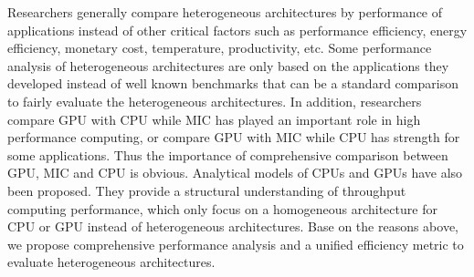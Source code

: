 Researchers generally compare heterogeneous architectures by performance of applications instead of other critical factors such as performance efficiency, energy efficiency, monetary cost, temperature, productivity, etc. Some performance analysis of heterogeneous architectures are only based on the applications they developed instead of well known benchmarks that can be a standard comparison to fairly evaluate the heterogeneous architectures. In addition, researchers compare GPU with CPU while MIC has played an important role in high performance computing, or compare GPU with MIC while CPU has strength for some applications. Thus the importance of comprehensive comparison between GPU, MIC and CPU is obvious. Analytical models of CPUs \cite{R:13} and GPUs \cite{R:14} have also been proposed. They provide a structural understanding of throughput computing performance, which only focus on a homogeneous architecture for CPU or GPU instead of heterogeneous architectures. Base on the reasons above, we propose comprehensive performance analysis and a unified efficiency metric to evaluate heterogeneous architectures.  

\vspace{-2mm} 